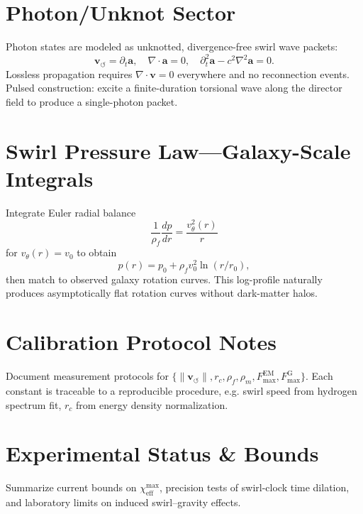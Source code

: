 \documentclass[10pt,reprint,aps,onecolumn,nofootinbib]{revtex4-2}
\begin{document}
    \section{Photon/Unknot Sector}
    \label{canon58:appE}
    Photon states are modeled as unknotted, divergence-free swirl wave packets:
    \[
        \mathbf{v}_{\!\boldsymbol{\circlearrowleft}} = \partial_t \mathbf{a}, \quad
        \nabla \cdot \mathbf{a} = 0, \quad
        \partial_t^{2}\mathbf{a} - c^{2}\nabla^{2}\mathbf{a} = 0.
    \]
    Lossless propagation requires $\nabla\cdot\mathbf{v}=0$ everywhere and
    no reconnection events. Pulsed construction: excite a finite-duration
    torsional wave along the director field to produce a single-photon packet.

    \section{Swirl Pressure Law—Galaxy-Scale Integrals}
    \label{canon58:appF}
    Integrate Euler radial balance
    \[
        \frac{1}{\rho_{\!f}}\frac{dp}{dr} = \frac{v_{\theta}^{2}(r)}{r}
    \]
    for $v_\theta(r)=v_0$ to obtain
    \[
        p(r) = p_0 + \rho_{\!f} v_0^{2} \ln(r/r_0),
    \]
    then match to observed galaxy rotation curves. This log-profile naturally
    produces asymptotically flat rotation curves without dark-matter halos.

    \section{Calibration Protocol Notes}
    \label{canon58:appG}
    Document measurement protocols for
    $\{\lVert \mathbf{v}_{\!\boldsymbol{\circlearrowleft}}\rVert, r_c, \rho_{\!f}, \rho_{\!m},
    F_{\max}^{\mathrm{EM}}, F_{\max}^{\mathrm{G}}\}$.
    Each constant is traceable to a reproducible procedure, e.g.
    swirl speed from hydrogen spectrum fit, $r_c$ from energy density normalization.

    \section{Experimental Status \& Bounds}
    \label{canon58:appH}
    Summarize current bounds on $\chi_{\mathrm{eff}}^{\max}$,
    precision tests of swirl-clock time dilation,
    and laboratory limits on induced swirl–gravity effects.
\end{document}
